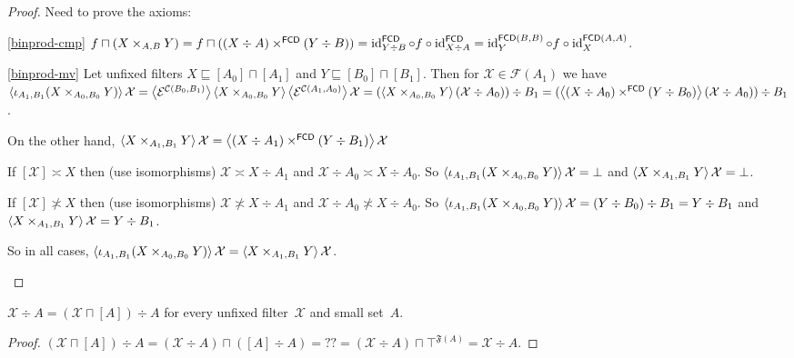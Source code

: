 \begin{proof}
Need to prove the axioms:

\begin{widedisorder}
\item[\ref{binprod-cmp}]
$f\sqcap(X\times_{A,B}Y)=
f\sqcap((X\div A)\times^{\mathsf{FCD}}(Y\div B))=
\operatorname{id}^{\mathsf{FCD}}_{Y\div B}\circ f\circ
\operatorname{id}^{\mathsf{FCD}}_{X\div A}=
\operatorname{id}^{\mathsf{FCD}(B,B)}_Y\circ f\circ\operatorname{id}^{\mathsf{FCD}(A,A)}_X$.

\item[\ref{binprod-mv}] Let unfixed filters
$X\sqsubseteq[A_0]\sqcap[A_1]$ and $Y\sqsubseteq[B_0]\sqcap[B_1]$.
Then for $\mathcal{X}\in\mathscr{F}(A_1)$ we have
$\left\langle \iota_{A_1,B_1}(X\times_{A_0,B_0}Y)\right\rangle\mathcal{X}=
\left\langle \mathcal{E}^{\mathcal{C}(B_0,B_1)}\right\rangle
\left\langle X\times_{A_0,B_0}Y\right\rangle
\left\langle \mathcal{E}^{\mathcal{C}(A_1,A_0)}\right\rangle\mathcal{X}=
(\left\langle X\times_{A_0,B_0}Y\right\rangle
(\mathcal{X}\div A_0))\div B_1=
(\left\langle (X\div A_0)\times^{\mathsf{FCD}}
(Y\div B_0)\right\rangle(\mathcal{X}\div A_0))\div B_1$.

On the other hand,
$\left\langle X\times_{A_1,B_1}Y\right\rangle\mathcal{X}=
\left\langle (X\div A_1)\times^{\mathsf{FCD}}
(Y\div B_1)\right\rangle\mathcal{X}$

If $[\mathcal{X}]\asymp X$ then (use isomorphisms)
$\mathcal{X}\asymp X\div A_1$ and
$\mathcal{X}\div A_0\asymp X\div A_0$. So
$\left\langle \iota_{A_1,B_1}(X\times_{A_0,B_0}Y)\right\rangle\mathcal{X}=
\bot$ and
$\left\langle X\times_{A_1,B_1}Y\right\rangle\mathcal{X}=\bot$.

If $[\mathcal{X}]\nasymp X$ then (use isomorphisms)
$\mathcal{X}\nasymp X\div A_1$ and
$\mathcal{X}\div A_0\nasymp X\div A_0$. So
$\left\langle \iota_{A_1,B_1}(X\times_{A_0,B_0}Y)\right\rangle\mathcal{X}=
(Y\div B_0)\div B_1=Y\div B_1$ and
$\left\langle X\times_{A_1,B_1}Y\right\rangle\mathcal{X}=Y\div B_1$.

So in all cases,
$\left\langle \iota_{A_1,B_1}(X\times_{A_0,B_0}Y)\right\rangle\mathcal{X}=
\left\langle X\times_{A_1,B_1}Y\right\rangle\mathcal{X}$.
\end{widedisorder}
\end{proof}

\begin{lem}
$\mathcal{X}\div A=(\mathcal{X}\sqcap[A])\div A$
for every unfixed filter~$\mathcal{X}$ and small set~$A$.
\end{lem}

\begin{proof}
$(\mathcal{X}\sqcap[A])\div A=
(\mathcal{X}\div A)\sqcap([A]\div A)=
??=
(\mathcal{X}\div A)\sqcap\top^{\mathfrak{F}(A)}=
\mathcal{X}\div A$.
\end{proof}

